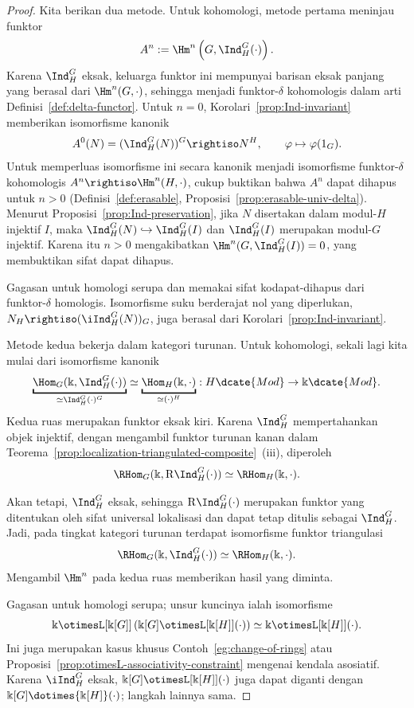 \begin{proof}
	Kita berikan dua metode. Untuk kohomologi, metode pertama meninjau funktor
	\[ A^n:=\Hm^n\left(G,\Ind^G_H(\cdot)\right). \]
	Karena $\Ind^G_H$ eksak, keluarga funktor ini mempunyai barisan eksak
	panjang yang berasal dari $\Hm^n(G,\cdot)$, sehingga menjadi funktor-$\delta$
	kohomologis dalam arti Definisi~\ref{def:delta-functor}. Untuk $n=0$,
	Korolari~\ref{prop:Ind-invariant} memberikan isomorfisme kanonik
	\[ A^0(N)=(\Ind^G_H(N))^G\rightiso N^H,\qquad
	\varphi\mapsto\varphi(1_G). \]
	Untuk memperluas isomorfisme ini secara kanonik menjadi isomorfisme
	funktor-$\delta$ kohomologis $A^n\rightiso\Hm^n(H,\cdot)$, cukup buktikan
	bahwa $A^n$ dapat dihapus untuk $n>0$
	(Definisi~\ref{def:erasable}, Proposisi~\ref{prop:erasable-univ-delta}).
	Menurut Proposisi~\ref{prop:Ind-preservation}, jika $N$ disertakan dalam
	modul-$H$ injektif $I$, maka
	$\Ind^G_H(N)\hookrightarrow\Ind^G_H(I)$ dan $\Ind^G_H(I)$ merupakan
	modul-$G$ injektif. Karena itu $n>0$ mengakibatkan
	$\Hm^n(G,\Ind^G_H(I))=0$, yang membuktikan sifat dapat dihapus.

	Gagasan untuk homologi serupa dan memakai sifat kodapat-dihapus dari
	funktor-$\delta$ homologis. Isomorfisme suku berderajat nol yang diperlukan,
	$N_H\rightiso(\iInd^G_H(N))_G$, juga berasal dari
	Korolari~\ref{prop:Ind-invariant}.

	Metode kedua bekerja dalam kategori turunan. Untuk kohomologi, sekali lagi
	kita mulai dari isomorfisme kanonik
	\[ \underbracket{\Hom_G(\Bbbk,\Ind^G_H(\cdot))}_{
	\simeq\Ind^G_H(\cdot)^G}
	\simeq
	\underbracket{\Hom_H(\Bbbk,\cdot)}_{\simeq(\cdot)^H}
	:H\dcate{Mod}\to\Bbbk\dcate{Mod}. \]
	Kedua ruas merupakan funktor eksak kiri. Karena $\Ind^G_H$ mempertahankan
	objek injektif, dengan mengambil funktor turunan kanan dalam
	Teorema~\ref{prop:localization-triangulated-composite}~(iii), diperoleh
	\begin{equation*}
		\RHom_G(\Bbbk,\mathrm{R}\Ind^G_H(\cdot))
		\simeq\RHom_H(\Bbbk,\cdot).
	\end{equation*}

	Akan tetapi, $\Ind^G_H$ eksak, sehingga $\mathrm{R}\Ind^G_H(\cdot)$
	merupakan funktor yang ditentukan oleh sifat universal lokalisasi dan dapat
	tetap ditulis sebagai $\Ind^G_H$. Jadi, pada tingkat kategori turunan
	terdapat isomorfisme funktor triangulasi
	\[ \RHom_G(\Bbbk,\Ind^G_H(\cdot))
	\simeq\RHom_H(\Bbbk,\cdot). \]
	Mengambil $\Hm^n$ pada kedua ruas memberikan hasil yang diminta.

	Gagasan untuk homologi serupa; unsur kuncinya ialah isomorfisme
	\[ \Bbbk\otimesL[{\Bbbk[G]}]
	\left(\Bbbk[G]\otimesL[{\Bbbk[H]}](\cdot)\right)
	\simeq\Bbbk\otimesL[{\Bbbk[H]}](\cdot). \]
	Ini juga merupakan kasus khusus Contoh~\ref{eg:change-of-rings} atau
	Proposisi~\ref{prop:otimesL-associativity-constraint} mengenai kendala
	asosiatif. Karena $\iInd^G_H$ eksak,
	$\Bbbk[G]\otimesL[{\Bbbk[H]}](\cdot)$ juga dapat diganti dengan
	$\Bbbk[G]\dotimes{\Bbbk[H]}(\cdot)$; langkah lainnya sama.
\end{proof}

